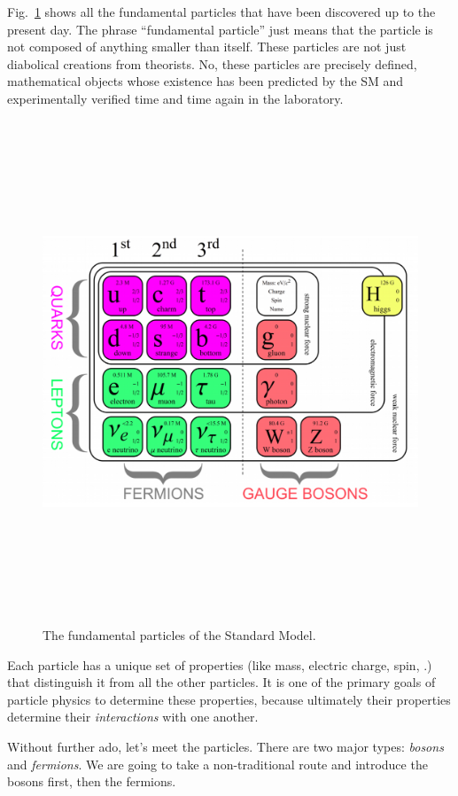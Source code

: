 Fig.~\ref{fig:particulartable} shows all the fundamental particles that have been discovered up to the present day.
The phrase ``fundamental particle'' just means that the particle is not composed of anything smaller than itself. 
These particles are not just diabolical creations from theorists. 
No, these particles are precisely defined, mathematical objects whose existence has been predicted by the SM and experimentally verified time and time again in the laboratory.
\begin{figure}[pbth]
\centering
\includegraphics[width=15cm,height=15cm,keepaspectratio]{figures/sm/particular_table_updated.png}
    \caption{The fundamental particles of the Standard Model.} 
    \label{fig:particulartable}
\end{figure}

Each particle has a unique set of properties (like mass, electric charge, spin, \etc.) that distinguish it from all the other particles. 
It is one of the primary goals of particle physics to determine these properties, because ultimately their properties determine their \emph{interactions} with one another. 

Without further ado, let's meet the particles.
There are two major types: \emph{bosons} and \emph{fermions}.
We are going to take a non-traditional route and introduce the bosons first, then the fermions.

